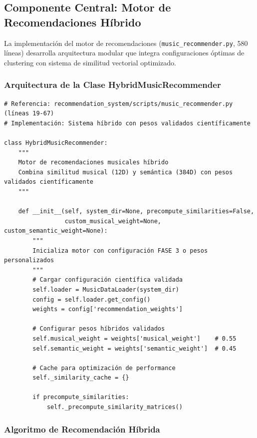 \documentclass[12pt,a4paper]{report}
\begin{document}
\subsection{Componente Central: Motor de Recomendaciones Híbrido}

La implementación del motor de recomendaciones (\texttt{music\_recommender.py}, 580 líneas) desarrolla arquitectura modular que integra configuraciones óptimas de clustering con sistema de similitud vectorial optimizado.

\subsubsection{Arquitectura de la Clase HybridMusicRecommender}

\begin{lstlisting}[caption={Arquitectura Principal del Sistema Híbrido}]
# Referencia: recommendation_system/scripts/music_recommender.py (líneas 19-67)
# Implementación: Sistema híbrido con pesos validados científicamente

class HybridMusicRecommender:
    """
    Motor de recomendaciones musicales híbrido
    Combina similitud musical (12D) y semántica (384D) con pesos validados científicamente
    """

    def __init__(self, system_dir=None, precompute_similarities=False,
                 custom_musical_weight=None, custom_semantic_weight=None):
        """
        Inicializa motor con configuración FASE 3 o pesos personalizados
        """
        # Cargar configuración científica validada
        self.loader = MusicDataLoader(system_dir)
        config = self.loader.get_config()
        weights = config['recommendation_weights']

        # Configurar pesos híbridos validados
        self.musical_weight = weights['musical_weight']    # 0.55
        self.semantic_weight = weights['semantic_weight']  # 0.45

        # Cache para optimización de performance
        self._similarity_cache = {}

        if precompute_similarities:
            self._precompute_similarity_matrices()
\end{lstlisting}

\subsubsection{Algoritmo de Recomendación Híbrida}
\end{document}
